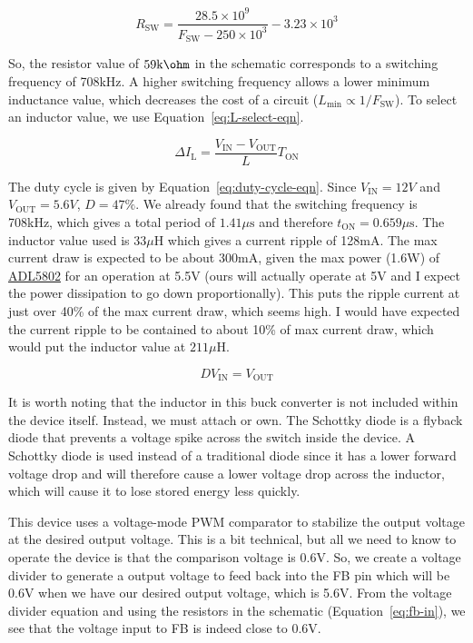 \documentclass{default}
\begin{document}
\begin{equation}
  R_{\text{SW}}=\frac{28.5\times 10^9}{F_{\text{SW}}-250\times 10^3}-3.23\times 10^3
\end{equation}

So, the resistor value of $\text{59k$\ohm$}$ in the schematic corresponds to a switching frequency
of 708kHz. A higher switching frequency allows a lower minimum inductance value, which decreases the
cost of a circuit ($L_{\text{min}}\propto 1/F_{\text{SW}}$). To select an inductor value, we use
Equation~\ref{eq:L-select-eqn}.

\begin{equation}
  \Delta I_{\text{L}} = \frac{V_{\text{IN}}-V_{\text{OUT}}}{L} T_{\text{ON}}
  \label{eq:L-select-eqn}
\end{equation}

The duty cycle is given by Equation~\ref{eq:duty-cycle-eqn}. Since $V_{\text{IN}} = 12V$ and
$V_{\text{OUT}} = 5.6V$, $D = 47\%$. We already found that the switching frequency is 708kHz, which
gives a total period of $1. 41\mu \text{s}$ and therefore $t_{\text{ON}} = 0.659\mu \text{s}$. The
inductor value used is $33\mu \text{H}$ which gives a current ripple of 128mA. The max current draw
is expected to be about 300mA, given the max power (1.6W) of
\href{http://www.analog.com/media/en/technical-documentation/data-sheets/ADL5802.pdf}{ADL5802} for
an operation at 5.5V (ours will actually operate at 5V and I expect the power dissipation to go down
proportionally). This puts the ripple current at just over 40\% of the max current draw, which seems
high. I would have expected the current ripple to be contained to about 10\% of max current draw,
which would put the inductor value at $211\mu\text{H}$.

\begin{equation} DV_{\text{IN}} = V_{\text{OUT}}
  \label{eq:duty-cycle-eqn}
\end{equation}

It is worth noting that the inductor in this buck converter is not included within the device
itself. Instead, we must attach or own. The Schottky diode is a flyback diode that prevents a
voltage spike across the switch inside the device. A Schottky diode is used instead of a traditional
diode since it has a lower forward voltage drop and will therefore cause a lower voltage drop across
the inductor, which will cause it to lose stored energy less quickly.

This device uses a voltage-mode PWM comparator to stabilize the output voltage at the desired output
voltage. This is a bit technical, but all we need to know to operate the device is that the
comparison voltage is 0.6V. So, we create a voltage divider to generate a output voltage to feed
back into the FB pin which will be 0.6V when we have our desired output voltage, which is 5.6V. From
the voltage divider equation and using the resistors in the schematic (Equation~\ref{eq:fb-in}), we
see that the voltage input to FB is indeed close to 0.6V.
\end{document}
